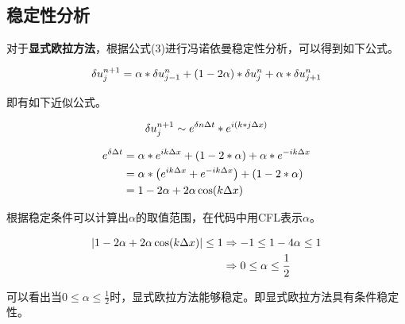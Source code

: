 \documentclass[final]{cvpr}
\begin{document}
\subsection{稳定性分析}
对于\textbf{显式欧拉方法}，根据公式(3)进行冯诺依曼稳定性分析，可以得到如下公式。
\begin{center}
	\begin{scriptsize}
		\begin{equation}
			\begin{aligned}
				\setlength{\abovedisplayskip}{-5pt}
				\delta u_{j}^{n+1}=\alpha * \delta u_{j-1}^{n}+(1-2 \alpha) * \delta u_{j}^{n}+\alpha * \delta u_{j+1}^{n} 
			\end{aligned}
		\end{equation}
	\end{scriptsize}
\end{center}
即有如下近似公式。
\begin{center}
	\begin{scriptsize}
		\begin{equation}
			\setlength{\abovedisplayskip}{-5pt}
\delta u_{j}^{n+1} \sim e^{\delta n \Delta t} * e^{i(k * j \Delta x)}
		\end{equation}
	\end{scriptsize}
\end{center}
\begin{center}
	\begin{scriptsize}
		\begin{equation}
			\begin{aligned}
				\setlength{\abovedisplayskip}{-5pt}
				e^{\delta \Delta t}&=\alpha * e^{i k \Delta x}+(1-2 * \alpha)+\alpha * e^{-i k \Delta x}\\
				&=\alpha *\left(e^{i k \Delta x}+e^{-i k \Delta x}\right)+(1-2 * \alpha) \\
				&=1-2 \alpha+2 \alpha \cos (k \Delta x)
			\end{aligned}
		\end{equation}
	\end{scriptsize}
\end{center}
根据稳定条件可以计算出$\alpha$的取值范围，在代码中用CFL表示$\alpha$。
\begin{center}
	\begin{scriptsize}
		\begin{equation}
			\begin{aligned}
			\setlength{\abovedisplayskip}{-5pt}
			|1-2 \alpha+2 \alpha \cos (k \Delta x)| \leq 1&\Rightarrow-1 \leq 1-4 \alpha \leq 1  \\
			&\Rightarrow 0 \leq \alpha \leq \frac{1}{2}
			\end{aligned}
		\end{equation}
	\end{scriptsize}
\end{center}
可以看出当$0 \leq \alpha \leq \frac{1}{2}$时，显式欧拉方法能够稳定。即显式欧拉方法具有条件稳定性。\\
\end{document}
